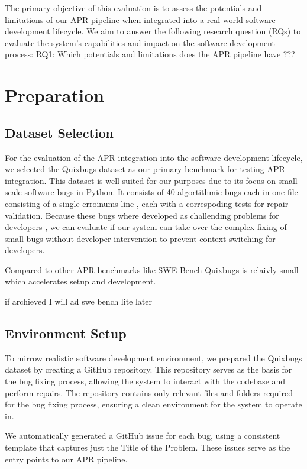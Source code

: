 The primary objective of this evaluation is to assess the potentials and limitations of our APR pipeline when integrated into a real-world software development lifecycle. We aim to answer the following research question (RQs) to evaluate the system's capabilities and impact on the software development process:
RQ1: Which potentials and limitations does the APR pipeline have ???

\section{Preparation}
\subsection{Dataset Selection}
For the evaluation of the APR integration into the software development lifecycle, we selected the Quixbugs dataset \cite{linQuixBugsMultilingualProgram2017} as our primary benchmark for testing APR integration. This dataset is well-suited for our purposes due to its focus on small-scale software bugs in Python. It consists of 40 algortithmic bugs each in one file consisting of a single erroinums line , each with a correspoding tests for repair validation. Because these bugs where developed as challending problems for developers \cite{linQuixBugsMultilingualProgram2017}, we can evaluate if our system can take over the complex fixing of small bugs without developer intervention to prevent context switching for developers.

Compared to other APR benchmarks like SWE-Bench \cite{jimenezSWEbenchCanLanguage2024} Quixbugs is relaivly small which accelerates setup and development.

if archieved I will ad swe bench lite later \cite{jimenezSWEbenchCanLanguage2024}

\subsection{Environment Setup}
To mirrow realistic software development environment, we prepared the Quixbugs dataset by creating a GitHub repository. This repository serves as the basis for the bug fixing process, allowing the system to interact with the codebase and perform repairs. The repository contains only relevant files and folders required for the bug fixing process, ensuring a clean environment for the system to operate in.

We automatically generated a GitHub issue for each bug, using a consistent template that captures just the Title of the Problem. These issues serve as the entry points to our APR pipeline.

